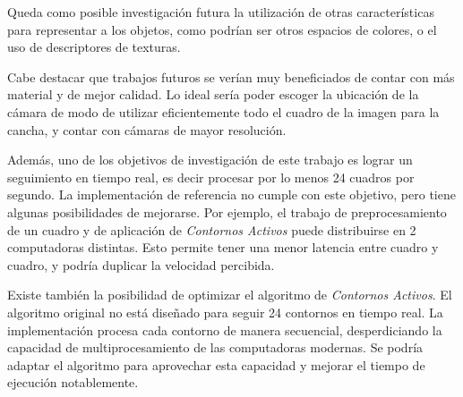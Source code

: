Queda como posible investigación futura la utilización de otras características
para representar a los objetos, como podrían ser otros espacios de colores, o
el uso de descriptores de texturas.

Cabe destacar que trabajos futuros se verían muy beneficiados de contar con más
material y de mejor calidad. Lo ideal sería poder escoger la ubicación de la
cámara de modo de utilizar eficientemente todo el cuadro de la imagen para la
cancha, y contar con cámaras de mayor resolución.

Además, uno de los objetivos de investigación de este trabajo es lograr un seguimiento en
tiempo real, es decir procesar por lo menos 24 cuadros por segundo. La
implementación de referencia no cumple con este objetivo, pero tiene algunas 
posibilidades de mejorarse. Por ejemplo, el trabajo de preprocesamiento de un cuadro
y de aplicación de \textit{Contornos Activos} puede distribuirse en 2
computadoras distintas. Esto permite tener una menor latencia entre cuadro y
cuadro, y podría duplicar la velocidad percibida.

Existe también la posibilidad de optimizar el algoritmo de \textit{Contornos
Activos}. El algoritmo original no está diseñado para seguir 24 contornos en
tiempo real. La implementación procesa cada contorno de manera secuencial,
desperdiciando la capacidad de multiprocesamiento de las computadoras modernas.
Se podría adaptar el algoritmo para aprovechar esta capacidad y mejorar el
tiempo de ejecución notablemente.

